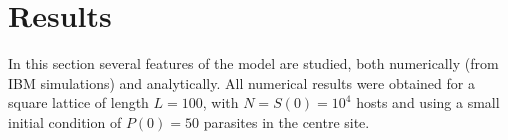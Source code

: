 \begin{table}[H]
    \centering
    \caption{Variables and parameters of the model}
    \label{tab:my_label}
\end{table}

\section{Results}\label{sec:results}
In this section several features of the model are studied, both numerically
(from IBM simulations) and analytically. All numerical results were obtained
for a square lattice of length $L=100$, with $N=S(0)=10^4$ hosts and using a
small initial condition of $P(0)=50$ parasites in the centre site.

